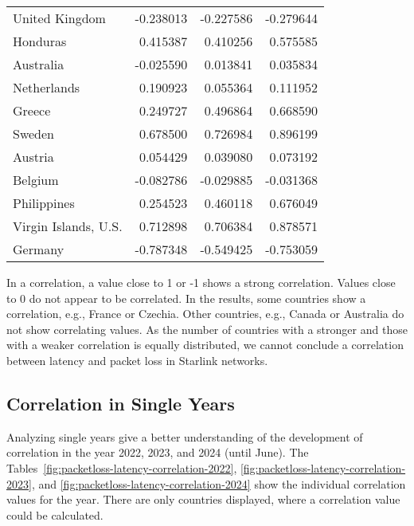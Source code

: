 \begin{table}
\begin{tabular}{lrrr}
		United Kingdom              & -0.238013           & -0.227586           & -0.279644            \\
		Honduras                    & 0.415387            & 0.410256            & 0.575585             \\
		Australia                   & -0.025590           & 0.013841            & 0.035834             \\
		Netherlands                 & 0.190923            & 0.055364            & 0.111952             \\
		Greece                      & 0.249727            & 0.496864            & 0.668590             \\
		Sweden                      & 0.678500            & 0.726984            & 0.896199             \\
		Austria                     & 0.054429            & 0.039080            & 0.073192             \\
		Belgium                     & -0.082786           & -0.029885           & -0.031368            \\
		Philippines                 & 0.254523            & 0.460118            & 0.676049             \\
		Virgin Islands, U.S.        & 0.712898            & 0.706384            & 0.878571             \\
		Germany                     & -0.787348           & -0.549425           & -0.753059            \\
		\bottomrule
	\end{tabular}
\end{table}

In a correlation, a value close to 1 or -1 shows a strong correlation. Values close to 0 do not appear to be correlated.
In the results, some countries show a correlation, e.g., France or Czechia. Other countries, e.g., Canada or Australia do not show correlating values.
As the number of countries with a stronger and those with a weaker correlation is equally distributed, we cannot conclude a correlation between latency and packet loss in Starlink networks.

\subsection{Correlation in Single Years}

Analyzing single years give a better understanding of the development of correlation in the year 2022, 2023, and 2024 (until June).
The Tables~\ref{fig:packetloss-latency-correlation-2022}, \ref{fig:packetloss-latency-correlation-2023}, and \ref{fig:packetloss-latency-correlation-2024} show the individual correlation values for the year. There are only countries displayed, where a correlation value could be calculated.

